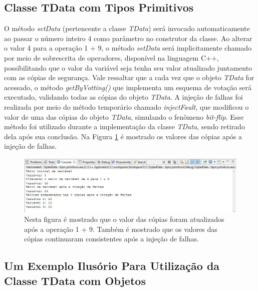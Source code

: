 \subsection{Classe TData com Tipos Primitivos} \label{subsec:TDataPrimitivo}

O método \textit{setData} (pertencente a classe \textit{TData}) será invocado automaticamente ao passar o número inteiro 4 como parâmetro no construtor da classe. Ao alterar o valor 4 para a operação 1 + 9, o método \textit{setData} será implicitamente chamado por meio de sobrescrita de operadores, disponível na linguagem C++, possibilitando que o valor da variável seja tenha seu valor atualizado juntamento com as cópias de segurança. Vale ressaltar que a cada vez que o objeto \textit{TData} for acessado, o método \textit{getByVotting()} que implementa um esquema de votação será executado, validando todas as cópias do objeto \textit{TData}. A injeção de falhas foi realizada por meio do método temporário chamado \textit{injectFault}, que modificou o valor de uma das cópias do objeto \textit{TData}, simulando o fenômeno \textit{bit-flip}. Esse método foi utilizado durante a implementação da classe \textit{TData}, sendo retirado dela após sua conclusão. Na Figura \ref{Img:tdataPrimitivo} é mostrado os valores das cópias após a injeção de falhas.

\begin{figure}[H]
	\centering
	\includegraphics[width=1.0\textwidth]{figuras/tdataPrimitivo.jpg}
	\caption[Figura que apresenta a saída com os valores das cópias consistentes para tipos primitivos após a injeção de falhas.]{Nesta figura é mostrado que o valor das cópias foram atualizados após a operação 1 + 9. Também é mostrado que os valores das cópias continuaram consistentes após a injeção de falhas.}
	\label{Img:tdataPrimitivo}	
\end{figure}	


\subsection{Um Exemplo Ilusório Para Utilização da Classe TData com Objetos} \label{subsec:exemploTData}

